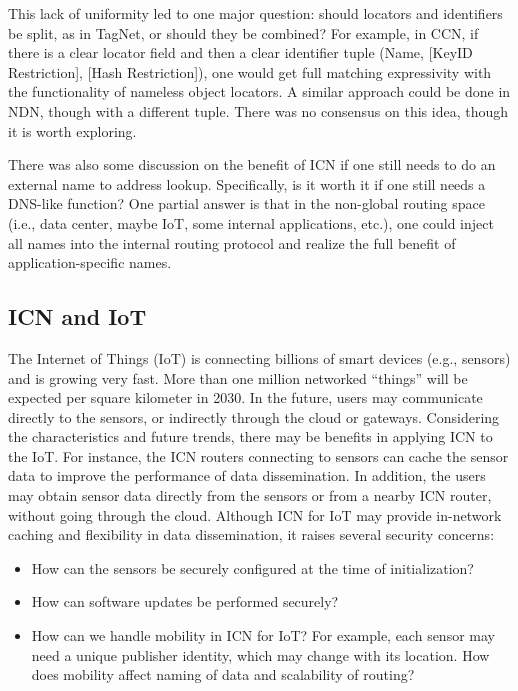 This lack of uniformity led to one major question: should locators and identifiers
be split, as in TagNet, or should they be combined? For example, in CCN, if there is a clear locator
field and then a clear identifier tuple (Name, [KeyID Restriction], [Hash Restriction]),
one would get full matching expressivity with the functionality of nameless object locators.
A similar approach could be done in NDN, though with a different tuple.  There was no
consensus on this idea, though it is worth exploring.

There was also some discussion on the benefit of ICN if one still needs to do an external
name to address lookup. Specifically, is it worth it if one still needs a DNS-like function?
One partial answer is that in the non-global routing space (i.e., data center, maybe IoT, some internal
applications, etc.), one could inject all names into the internal routing protocol and realize
the full benefit of application-specific names.

\subsection{ICN and IoT}
The Internet of Things (IoT) is connecting billions of smart devices (e.g., sensors) and is growing
very fast. More than one million networked ``things'' will be expected per square kilometer in 2030.
In the future, users may communicate directly to the sensors, or indirectly through the cloud or gateways.
Considering the characteristics and future trends, there may be benefits in applying ICN to the IoT. For instance,
the ICN routers connecting to sensors can cache the sensor data to improve the performance of data
dissemination. In addition, the users may obtain sensor data directly from the sensors or from a
nearby ICN router, without going through the cloud. Although ICN for IoT may provide in-network
caching and flexibility in data dissemination, it raises several security concerns:

\begin{itemize}
\item How can the sensors be securely configured at the time of initialization?
\item How can software updates be performed securely?
\item How can we handle mobility in ICN for IoT? For example, each sensor may need a unique publisher
identity, which may change with its location. How does mobility affect naming of data and scalability of routing?
\end{itemize}

